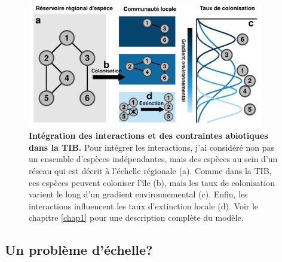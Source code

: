 \begin{figure}[htbp]
\centering
\includegraphics[width=0.92000\textwidth]{fig/fig2.pdf}
\caption[Intégration des interactions et des contraintes abiotiques dans la TIB.]{\textbf{Intégration des interactions et des contraintes
abiotiques dans la TIB.} Pour intégrer les interactions, j'ai considéré
non pas un ensemble d'espèces indépendantes, mais des espèces au sein
d'un réseau qui est décrit à l'échelle régionale (a). Comme dans la TIB,
ces espèces peuvent coloniser l'île (b), mais les taux de colonisation
varient le long d'un gradient environnemental (c). Enfin, les
interactions influencent les taux d'extinction locale (d). Voir le
chapitre \ref{chap1} pour une description complète du
modèle.\label{fig:figGTIB}}
\end{figure}

\subsection*{Un problème d'échelle?}\label{un-probluxe8me-duxe9chelle}


